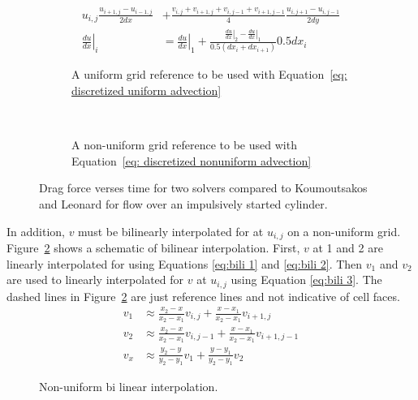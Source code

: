\documentclass[onehalf,11pt]{beavtex}
\begin{document}
\begin{align}
u_{i,j}\frac{u_{i+1,j} - u_{i-1,j}}{2dx} &+ \frac{v_{i,j} + v_{i+1,j} + v_{i,j-1} + v_{i+1,j-1}}{4}\frac{u_{i,j+1} - u_{i,j-1}}{2dy} \label{eq: discretized uniform advection}\\
\left.\frac{du}{dx}\right|_i&=\left.\frac{du}{dx}\right|_1 + \frac{\left.\frac{du}{dx}\right|_2 - \left.\frac{du}{dx}\right|_1}{0.5(dx_i + dx_{i+1})}0.5dx_i\; \label{eq: discretized nonuniform advection} 
\end{align}
\begin{figure}[!htb]
	\centering
	\begin{subfigure}{0.4\textwidth}
		
		\caption{A uniform grid reference to be used with Equation~\eqref{eq: discretized uniform advection}}
	\end{subfigure}
	~
	\begin{subfigure}{0.4\textwidth}
		
		\caption{A non-uniform grid reference to be used with Equation~\eqref{eq: discretized nonuniform advection}}
	\end{subfigure}
	\caption{Drag force verses time for two solvers compared to Koumoutsakos and Leonard for flow over an impulsively started cylinder.}
	\label{fig:discretized uniform advection}
\end{figure}

In addition, $v$ must be bilinearly interpolated for at $u_{i,j}$ on a non-uniform grid.
Figure~\ref{fig:bi-linear-interpolation} shows a schematic of bilinear interpolation.
First, $v$ at 1 and 2 are linearly interpolated for using Equations \eqref{eq:bili 1} and \eqref{eq:bili 2}. 
Then $v_1$ and $v_2$ are used to linearly interpolated for $v$ at $u_{i,j}$ using Equation \eqref{eq:bili 3}. 
The dashed lines in Figure~\ref{fig:bi-linear-interpolation} are just reference lines and not indicative of cell faces. 
\begin{align}
v_1 &\approx \frac{x_2 - x}{x_2 - x_1}v_{i,j} + \frac{x - x_1}{x_2 - x_1}v_{i+1,j} \label{eq:bili 1} \\
v_2 &\approx \frac{x_2 - x}{x_2 - x_1}v_{i,j-1} + \frac{x - x_1}{x_2 - x_1}v_{i+1,j-1} \label{eq:bili 2} \\
v_x &\approx \frac{y_2 - y}{y_2 - y_1}v_{1} + \frac{y - y_1}{y_2 - y_1}v_{2} \; \label{eq:bili 3}
\end{align}
\begin{figure}[htb]
	\centering
	
	\caption{Non-uniform bi linear interpolation.}
	\label{fig:bi-linear-interpolation}
\end{figure}
\end{document}
